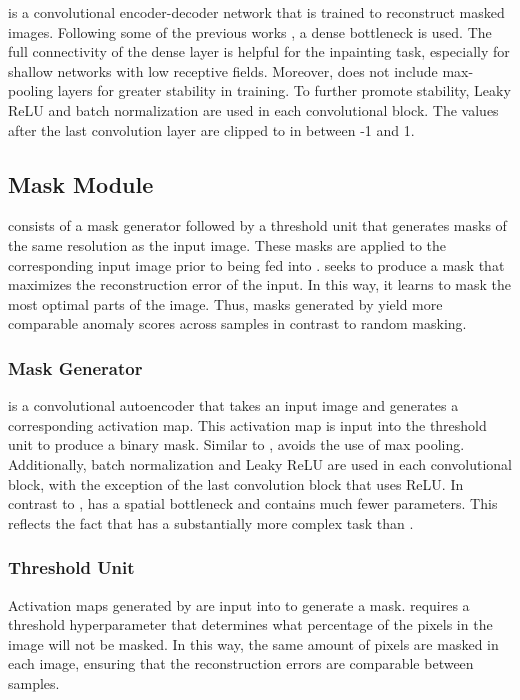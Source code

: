 \documentclass[10pt,twocolumn,letterpaper]{article}
\begin{document}
  is a convolutional encoder-decoder network that is trained to reconstruct masked images. Following some of the previous works  \cite{baur2020autoencoders}, a dense bottleneck is used. The full connectivity of the dense layer is helpful for the inpainting task, especially for shallow networks with low receptive fields. Moreover,  does not include max-pooling layers for greater stability in training. To further promote stability, Leaky ReLU and batch normalization are used in each convolutional block. The values after the last convolution layer are clipped to in between -1 and 1.


\subsection{Mask Module}

 consists of a mask generator  followed by a threshold unit  that generates masks of the same resolution as the input image. These masks are applied to the corresponding input image prior to being fed into .  seeks to produce a mask that maximizes the reconstruction error of the input. In this way, it learns to mask the most optimal parts of the image. Thus, masks generated by  yield more comparable anomaly scores across samples in contrast to random masking. 

\subsubsection{Mask Generator}  is a convolutional autoencoder that takes an input image and generates a corresponding activation map. This activation map is input into the threshold unit to produce a binary mask. Similar to ,  avoids the use of max pooling. Additionally, batch normalization and Leaky ReLU are used in each convolutional block, with the exception of the last convolution block that uses ReLU. In contrast to ,  has a spatial bottleneck and contains much fewer parameters. This reflects the fact that  has a substantially more complex task than .  

\subsubsection{Threshold Unit} Activation maps generated by  are input into  to generate a mask.  requires a threshold hyperparameter that determines what percentage of the pixels in the image will not be masked. In this way, the same amount of pixels are masked in each image, ensuring that the reconstruction errors are comparable between samples. 
\end{document}
